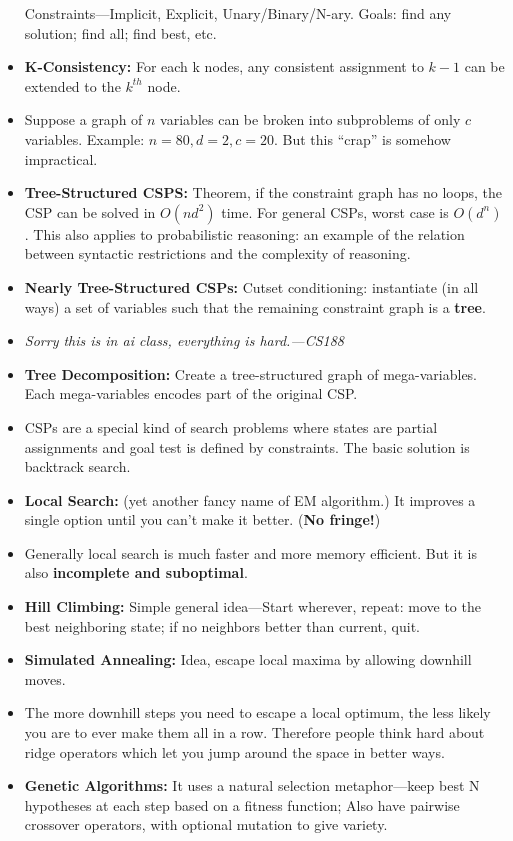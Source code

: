 \documentclass[twocolumn]{article}
\begin{document}
\begin{itemize}
  Constraints---Implicit, Explicit, Unary/Binary/N-ary. Goals: find
  any solution; find all; find best, etc.
\item \textbf{K-Consistency:} For each k nodes, any consistent
  assignment to $k-1$ can be extended to the $k^{th}$ node.
\item Suppose a graph of $n$ variables can be broken into subproblems
  of only $c$ variables. Example: $n=80, d=2, c=20$. But this ``crap''
  is somehow impractical. 
\item \textbf{Tree-Structured CSPS:} Theorem, if the constraint graph
  has no loops, the CSP can be solved in $O(nd^{2})$ time. For general
  CSPs, worst case is $O(d^{n})$. This also applies to probabilistic
  reasoning: an example of the relation between syntactic restrictions
  and the complexity of reasoning.
\item \textbf{Nearly Tree-Structured CSPs:} Cutset conditioning:
  instantiate (in all ways) a set of variables such that the remaining
  constraint graph is a \textbf{tree}.
\item \emph{Sorry this is in ai class, everything is hard.---CS188}
\item \textbf{Tree Decomposition:} Create a tree-structured graph of
  mega-variables. Each mega-variables encodes part of the original
  CSP. 
\item CSPs are a special kind of search problems where states are
  partial assignments and goal test is defined by constraints. The
  basic solution is backtrack search.
\item \textbf{Local Search:} (yet another fancy name of EM algorithm.)
  It improves a single option until you can't make it
  better. (\textbf{No fringe!}) 
\item Generally local search is much faster and more memory
  efficient. But it is also \textbf{incomplete and suboptimal}.
\item \textbf{Hill Climbing:} Simple general idea---Start wherever,
  repeat: move to the best neighboring state; if no neighbors better
  than current, quit.
\item \textbf{Simulated Annealing:} Idea, escape local maxima by
  allowing downhill moves.
\item The more downhill steps you need to escape a local optimum, the
  less likely you are to ever make them all in a row. Therefore people
  think hard about ridge operators which let you jump around the space
  in better ways.
\item \textbf{Genetic Algorithms:} It uses a natural selection
  metaphor---keep best N hypotheses at each step based on a fitness
  function; Also have pairwise crossover operators, with optional
  mutation to give variety. 
\end{itemize}
\end{document}
